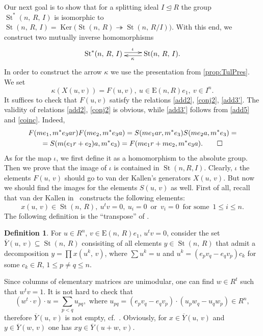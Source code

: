 \documentclass[11pt]{amsart}
\theoremstyle{plain} \declaretheorem[name=Theorem, Refname={Theorem,Theorems}]{tm} \Crefname{tm}{Theorem}{Theorems}
\numberwithin{equation}{section}
\theoremstyle{definition} \newtheorem{df}[lm]{Definition} \Crefname{df}{Definition}{Definitions}
\theoremstyle{remark} \newtheorem{rk}[lm]{Remark} \Crefname{rk}{Remark}{Remarks}
\newcommand{\Ker}{\mathop{\mathrm{Ker}}\nolimits}
\newcommand{\E}{{\mathrm{E}}}
\newcommand{\St}{\mathop{\mathrm{St}}\nolimits}
\newcommand{\epi}{\twoheadrightarrow}
\begin{document}
Our next goal is to show that for a splitting ideal $I\trianglelefteq R$ the group $\St^*(n,\,R,\,I)$ is isomorphic to $\St(n,\,R,\,I)=\Ker\big(\St(n,\,R)\epi\St(n,\,R/I)\big)$.
With this end, we construct two mutually inverse homomorphisms
$$\xymatrix{\St^*(n,\,R,\,I)\ar@<0.5ex>[r]^{\iota}&\St(n,\,R,\,I)\ar@<0.5ex>[l]^{\kappa}.}$$
In order to construct the arrow $\kappa$ we use the presentation from \cref{prop:TulPres}.
We set $$\kappa(X(u,v)) = F(u,v),\ u\in \E(n, R)e_1,\ v\in I^n.$$ 
It suffices to check that $F(u,v)$ satisfy the relations \eqref{add2}, \eqref{conj2}, \eqref{add3'}.
The validity of relations \eqref{add2}, \eqref{conj2} is obvious, while \eqref{add3'} follows from \eqref{add5} and \eqref{coinc}. Indeed,
\begin{multline} F(me_1, m^*e_3ar) F(me_2, m^*e_3a) = S(me_1ar, m^*e_3) S(me_2a, m^*e_3) = \\ = S(m(e_1r+e_2)a, m^*e_3) = F(me_1r+me_2, m^*e_3a). \qedhere \end{multline}
As for the map $\iota$, we first define it as a homomorphism to the absolute group. %
Then we prove that the image of $\iota$ is contained in $\St(n, R, I)$.
Clearly, $\iota$ the elements $F(u,\,v)$ should go to van der Kallen's generators $X(u,\,v)$.
But now we should find the images for the elements $S(u,\,v)$ as well.
First of all, recall that van der Kallen in~\cite[3.8--3.10]{vdK} constructs the following elements:
$$x(u,\,v)\in\St(n,\,R),\ u^tv=0,\ u_i=0\,\text{ or }\,v_i=0\,\text{ for some }\,1\leq i\leq n.$$
The following definition is the ``transpose'' of \cite[3.13]{vdK}.
\begin{df} For $u\in R^n$, $v\in\E(n,\,R)e_1$, $u^tv=0$, consider the set $\overline Y(u,\,v)\subseteq\St(n,\,R)$
 consisiting of all elements $y\in\St(n,\,R)$ that admit a decomposition $y=\prod x(u^k,\,v)$, 
 where $\sum u^k=u$ and $u^k= (e_pv_q-e_qv_p)c_k$ for some $c_k\in R$, $1\leq p\neq q\leq n$. \end{df}

Since columns of elementary matrices are unimodular, one can find $w\in R^t$ such that $w^tv=1$.
It is not hard to check that \setcounter{equation}{6} \setcounter{lm}{7}
\begin{equation} (w^t\cdot v)\cdot u = \sum_{p<q}u_{pq},\text{ where }u_{pq} = (e_pv_q - e_qv_p)\cdot  (u_pw_q - u_qw_p)\in{}\!R^n, \label{eq:canonical}\end{equation}
therefore $\overline Y(u,\,v)$ is not empty, cf.~\cite[3.1--3.2]{vdK}.
Obviously, for $x\in\overline Y(u,\,v)$ and $y\in\overline Y(w,\,v)$ one has $xy\in\overline Y(u+w,\,v)$.
\end{document}
